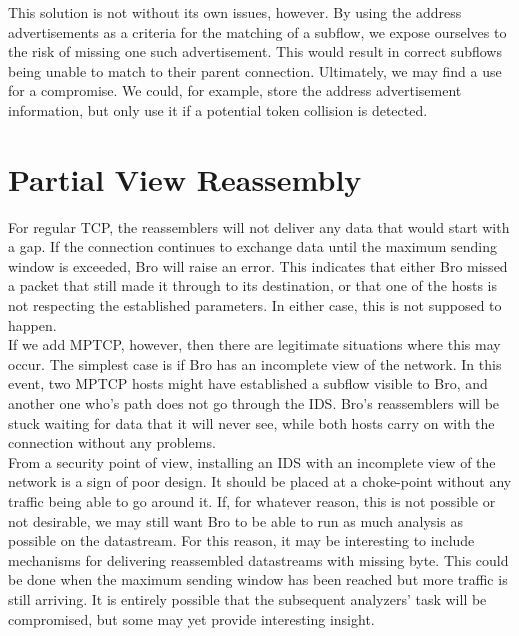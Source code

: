 This solution is not without its own issues, however. By using the address advertisements as a criteria for the matching of a subflow, we expose ourselves to the risk of missing one such  advertisement. This would result in correct subflows being unable to match to their parent connection. Ultimately, we may find a use for a compromise. We could, for example, store the address advertisement information, but only use it if a potential token collision is detected.


\section{Partial View Reassembly}
For regular TCP, the reassemblers will not deliver any data that would start with a gap. If the connection continues to exchange data until the maximum sending window is exceeded, Bro will raise an error. This indicates that either Bro missed a packet that still made it through to its destination, or that one of the hosts is not respecting the established parameters. In either case, this is not supposed to happen. \\

If we add MPTCP, however, then there are legitimate situations where this may occur. The simplest case is if Bro has an incomplete view of the network. In this event, two MPTCP hosts might have established a subflow visible to Bro, and another one who's path does not go through the IDS. Bro's reassemblers will be stuck waiting for data that it will never see, while both hosts carry on with the connection without any problems.\\

From a security point of view, installing an IDS with an incomplete view of the network is a sign of poor design. It should be placed at a choke-point without any traffic being able to go around it. If, for whatever reason, this is not possible or not desirable, we may still want Bro to be able to run as much analysis as possible on the datastream. For this reason, it may be interesting to include mechanisms for delivering reassembled datastreams with missing byte. This could be done when the maximum sending window has been reached but more traffic is still arriving. It is entirely possible that the subsequent analyzers' task will be compromised, but some may yet provide interesting insight.